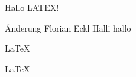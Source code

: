 \documentclass{article}
\begin{document}
Hallo LATEX!  

Änderung Florian Eckl Halli hallo

\LaTeX 

\huge
\LaTeX 
   
\end{document}
